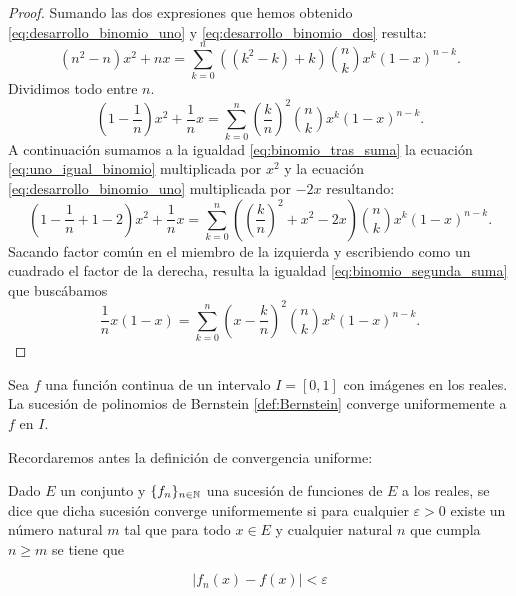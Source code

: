 \begin{proof}
Sumando las dos expresiones que hemos obtenido
 \eqref{eq:desarrollo_binomio_uno} y \eqref{eq:desarrollo_binomio_dos}
 resulta: 
 \begin{equation} 
    (n^2 - n)  x^2 + nx= \sum_{k=0}^{n} ((k^2 - k)+k) \binom{n}{k} x^{k} (1-x)^{n-k}.
  \end{equation}
  Dividimos todo entre $n$. 
  \begin{equation} \label{eq:binomio_tras_suma}
    (1 - \frac{1}{n})  x^2 + \frac{1}{n}x= \sum_{k=0}^{n} \left( \frac{k}{n} \right)^2 \binom{n}{k} x^{k} (1-x)^{n-k}.
  \end{equation}
  A continuación sumamos a la igualdad \eqref{eq:binomio_tras_suma} la ecuación \eqref{eq:uno_igual_binomio} multiplicada por $x^2$ y la ecuación \eqref{eq:desarrollo_binomio_uno}
  multiplicada por $-2x$ resultando: 
  \begin{equation} 
    \left(1 - \frac{1}{n} + 1 -2 \right)  x^2 + \frac{1}{n}x= \sum_{k=0}^{n} \left( \left( \frac{k}{n} \right)^2 + x^2 -2x \right) \binom{n}{k} x^{k} (1-x)^{n-k}.
  \end{equation}
  Sacando factor común en el miembro de la izquierda y escribiendo como un cuadrado el factor de la derecha,  resulta la igualdad \ref{eq:binomio_segunda_suma} que buscábamos
  \begin{equation} 
     \frac{1}{n} x (1-x)= \sum_{k=0}^{n}  \left( x-\frac{k}{n} \right)^2  \binom{n}{k} x^{k} (1-x)^{n-k}.
  \end{equation}
\end{proof}

\begin{teorema}\label{teo:aproximacion_bernstein}

    Sea $f$ una función continua de un intervalo $I = [0,1]$ con imágenes en los reales. 
    La sucesión de polinomios de Bernstein
    \ref{def:Bernstein} converge uniformemente a $f$ en $I.$
    
\end{teorema}
Recordaremos antes la definición de convergencia uniforme: 

\begin{definicion}

    Dado $E$ un conjunto y $\{f_n\}_{n \in \mathbb{N}}$ una sucesión de funciones de $E$
    a los reales, se dice 
    que dicha sucesión converge uniformemente si para cualquier $\varepsilon > 0$ existe un número natural $m$ tal que 
    para todo $x   \in E$ y cualquier natural $n$ que cumpla $n \geq m$ se tiene que 

    \begin{equation*}
        |f_n(x) - f(x) | < \varepsilon
    \end{equation*}
    
\end{definicion}

